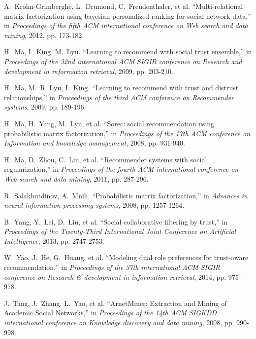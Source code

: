 \documentclass{ieeeaccess}
\begin{document}
\begin{thebibliography}{10}
A.~Krohn-Grimberghe, L.~Drumond, C.~Freudenthaler, et al.
\newblock ``Multi-relational matrix factorization using bayesian personalized ranking for social network data,''
\newblock in {\em Proceedings of the fifth ACM international conference on Web search and data mining}, 2012, pp. 173-182.

H.~Ma, I.~King, M.~Lyu.
\newblock ``Learning to recommend with social trust ensemble,''
\newblock in {\em Proceedings of the 32nd international ACM SIGIR conference on Research and development in information retrieval}, 2009, pp. 203-210.

H.~Ma, M.~R. Lyu, I.~King.
\newblock ``Learning to recommend with trust and distrust relationships,''
\newblock in {\em Proceedings of the third ACM conference on Recommender systems}, 2009, pp. 189-196.

H.~Ma, H.~Yang, M.~Lyu, et al.
\newblock ``Sorec: social recommendation using probabilistic matrix factorization,''
\newblock in {\em Proceedings of the 17th ACM conference on Information and knowledge management}, 2008, pp. 931-940.

H.~Ma, D.~Zhou, C.~Liu, et al.
\newblock ``Recommender systems with social regularization,''
\newblock in {\em Proceedings of the fourth ACM international conference on Web search and data mining}, 2011, pp. 287-296.

R.~Salakhutdinov, A.~Mnih.
\newblock ``Probabilistic matrix factorization,''
\newblock in {\em Advances in neural information processing systems}, 2008, pp. 1257-1264.

B.~Yang, Y.~Lei, D.~Liu, et al.
\newblock ``Social collaborative filtering by trust,''
\newblock in {\em Proceedings of the Twenty-Third International Joint Conference on Artificial Intelligence}, 2013, pp. 2747-2753.

W.~Yao, J.~He, G.~Huang, et al.
\newblock ``Modeling dual role preferences for trust-aware recommendation,''
\newblock in {\em Proceedings of the 37th international ACM SIGIR conference on Research \& development in information retrieval}, 2014, pp. 975-978.

J.~Tang, J.~Zhang, L.~Yao, et al.
\newblock ``ArnetMiner: Extraction and Mining of Academic Social Networks,''
\newblock in {\em Proceedings of the 14th ACM SIGKDD international conference on Knowledge discovery and data mining}, 2008, pp. 990-998.


\end{thebibliography}
\end{document}
